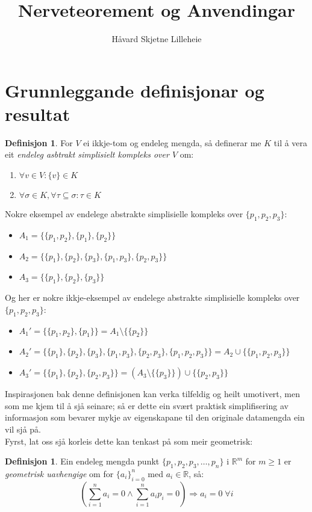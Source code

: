 \documentclass[a4paper, titlepage, 12pt, norsk]{article}
\title{Nerveteorement og Anvendingar}
\author{Håvard Skjetne Lilleheie}
\theoremstyle{plain}
\theoremstyle{definition}
\newtheorem{definition}[theorem]{Definisjon}
\newcommand{\R}{\mathbb{R}}
\begin{document}
\maketitle

\section{Grunnleggande definisjonar og resultat}

\begin{definition}
	For $V$ ei ikkje-tom og endeleg mengda, så definerar me $K$ til å vera eit \emph{endeleg asbtrakt simplisielt kompleks over $V$} om:
	\begin{enumerate}
		\item{$\forall v \in V: \{v\} \in K$}
		\item{$\forall \sigma \in K, \forall \tau \subseteq \sigma: \tau \in K$}
	\end{enumerate}
\end{definition}
\noindent Nokre eksempel av endelege abstrakte simplisielle kompleks over $\{p_1, p_2, p_3\}$:
\begin{itemize}
	\item{$A_1=\{\{p_1, p_2\}, \{p_1\}, \{p_2\}\}$}
	\item{$A_2=\{\{p_1\}, \{p_2\}, \{p_3\}, \{p_1, p_3\}, \{p_2, p_3\}\}$}
	\item{$A_3=\{\{p_1\}, \{p_2\}, \{p_3\}\}$}
\end{itemize}
Og her er nokre ikkje-eksempel av endelege abstrakte simplisielle kompleks over $\{p_1, p_2, p_3\}$:
\begin{itemize}
	\item{$A_1'=\{\{p_1, p_2\}, \{p_1\}\}=A_1 \setminus \{\{p_2\}\}$}
	\item{$A_2'=\{\{p_1\}, \{p_2\}, \{p_3\}, \{p_1, p_3\}, \{p_2, p_3\}, \{p_1, p_2, p_3\}\}=A_2 \cup \{\{p_1, p_2, p_3\}\}$}
	\item{$A_3'=\{\{p_1\}, \{p_2\}, \{p_2, p_3\}\}=\left(A_3 \setminus \{\{p_3\}\}\right) \cup \{\{p_2, p_3\}\}$}
\end{itemize}
Inspirasjonen bak denne definisjonen kan verka tilfeldig og heilt umotivert, men som me kjem til å sjå seinare; så er dette ein svært praktisk simplifisering av informasjon som bevarer mykje av eigenskapane til den originale datamengda ein vil sjå på. 
\\Fyrst, lat oss sjå korleis dette kan tenkast på som meir geometrisk:
\begin{definition}
	Ein endeleg mengda punkt $\{p_1, p_2, p_3, \dots, p_n\}$ i $\R^m$ for $m\geq1$ er \emph{geometrisk uavhengige} om for $\{a_i\}_{i=0}^n$ med $a_i\in\R$, så:
	\begin{equation*}
		\left(\sum_{i=1}^n a_i=0 \land  \sum_{i=1}^n a_ip_i=0\right)\Rightarrow a_i=0 \; \forall i
	\end{equation*}
\end{definition}
\end{document}
